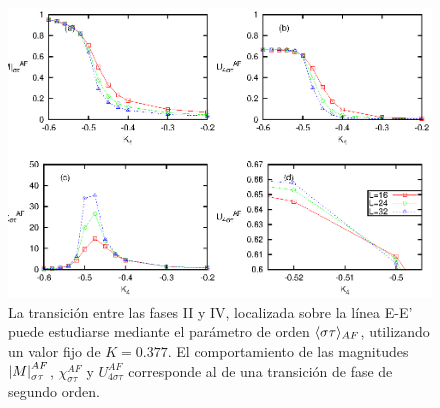 \begin{figure}[h!]
	\begin{center}
		\includegraphics[scale=0.8]{graf/phases/new_multi_AT_II_IV_b.eps}
	\end{center}
	\caption{La transición entre las fases II y IV, localizada sobre la línea E-E'
	puede estudiarse mediante el parámetro de orden $\langle \sigma\tau \rangle_{AF}$, utilizando un valor fijo de $K=0.377$.
	El comportamiento de las magnitudes $\left\vert M\right\vert_{\sigma\tau}^{AF}$, $\chi_{\sigma\tau}^{AF}$ y $U_{4\sigma\tau}^{AF}$
	corresponde al de una transici\'on de fase de segundo orden.}
	\label{fig:multi_AT_II_IV_b}
\end{figure}

